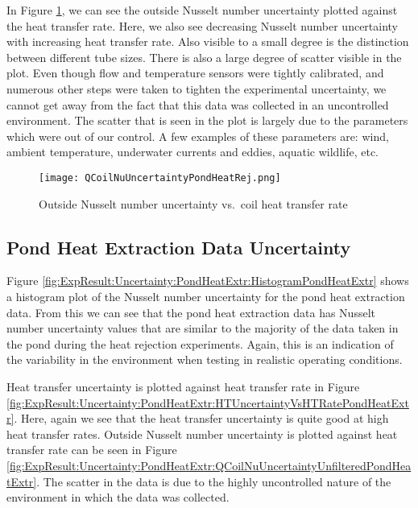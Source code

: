 In Figure \ref{fig:ExpResult:Uncertainty:PondHeatRej:QCoilNuUncertainty}, we can see the outside Nusselt number uncertainty plotted against the heat transfer rate. Here, we also see decreasing Nusselt number uncertainty with increasing heat transfer rate. Also visible to a small degree is the distinction between different tube sizes. There is also a large degree of scatter visible in the plot. Even though flow and temperature sensors were tightly calibrated, and numerous other steps were taken to tighten the experimental uncertainty, we cannot get away from the fact that this data was collected in an uncontrolled environment. The scatter that is seen in the plot is largely due to the parameters which were out of our control. A few examples of these parameters are: wind, ambient temperature, underwater currents and eddies, aquatic wildlife, etc.

\begin{figure}
	\centering
	\texttt{[image: QCoilNuUncertaintyPondHeatRej.png]}
	\caption{Outside Nusselt number uncertainty vs.\ coil heat transfer rate}
	\label{fig:ExpResult:Uncertainty:PondHeatRej:QCoilNuUncertainty}
\end{figure}

\subsection{Pond Heat Extraction Data Uncertainty}
\label{subsec:ExpResult:Uncertainty:PondExtr}

Figure \ref{fig:ExpResult:Uncertainty:PondHeatExtr:HistogramPondHeatExtr} shows a histogram plot of the Nusselt number uncertainty for the pond heat extraction data. From this we can see that the pond heat extraction data has Nusselt number uncertainty values that are similar to the majority of the data taken in the pond during the heat rejection experiments. Again, this is an indication of the variability in the environment when testing in realistic operating conditions.

Heat transfer uncertainty is plotted against heat transfer rate in Figure \ref{fig:ExpResult:Uncertainty:PondHeatExtr:HTUncertaintyVsHTRatePondHeatExtr}. Here, again we see that the heat transfer uncertainty is quite good at high heat transfer rates. Outside Nusselt number uncertainty is plotted against heat transfer rate can be seen in Figure \ref{fig:ExpResult:Uncertainty:PondHeatExtr:QCoilNuUncertaintyUnfilteredPondHeatExtr}. The scatter in the data is due to the highly uncontrolled nature of the environment in which the data was collected.


